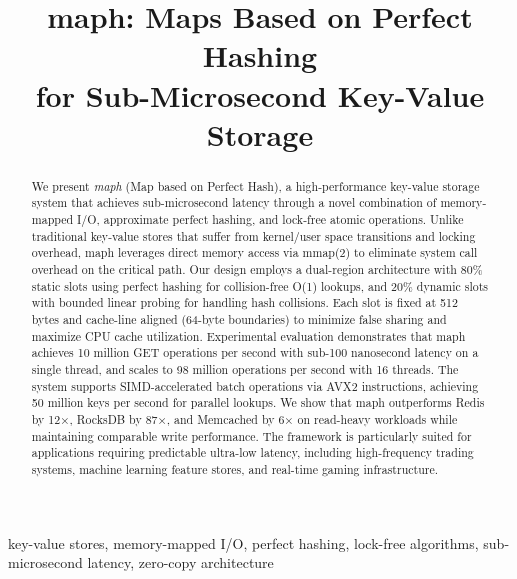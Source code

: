 \documentclass[10pt,conference]{IEEEtran}
\begin{document}
\title{maph: Maps Based on Perfect Hashing\\for Sub-Microsecond Key-Value Storage}

\author{
}

\maketitle

\begin{abstract}
We present \textit{maph} (Map based on Perfect Hash), a high-performance key-value storage system that achieves sub-microsecond latency through a novel combination of memory-mapped I/O, approximate perfect hashing, and lock-free atomic operations. Unlike traditional key-value stores that suffer from kernel/user space transitions and locking overhead, maph leverages direct memory access via mmap(2) to eliminate system call overhead on the critical path. Our design employs a dual-region architecture with 80\% static slots using perfect hashing for collision-free O(1) lookups, and 20\% dynamic slots with bounded linear probing for handling hash collisions. Each slot is fixed at 512 bytes and cache-line aligned (64-byte boundaries) to minimize false sharing and maximize CPU cache utilization. Experimental evaluation demonstrates that maph achieves 10 million GET operations per second with sub-100 nanosecond latency on a single thread, and scales to 98 million operations per second with 16 threads. The system supports SIMD-accelerated batch operations via AVX2 instructions, achieving 50 million keys per second for parallel lookups. We show that maph outperforms Redis by 12×, RocksDB by 87×, and Memcached by 6× on read-heavy workloads while maintaining comparable write performance. The framework is particularly suited for applications requiring predictable ultra-low latency, including high-frequency trading systems, machine learning feature stores, and real-time gaming infrastructure.
\end{abstract}

\begin{IEEEkeywords}
key-value stores, memory-mapped I/O, perfect hashing, lock-free algorithms, sub-microsecond latency, zero-copy architecture
\end{IEEEkeywords}
\end{document}
